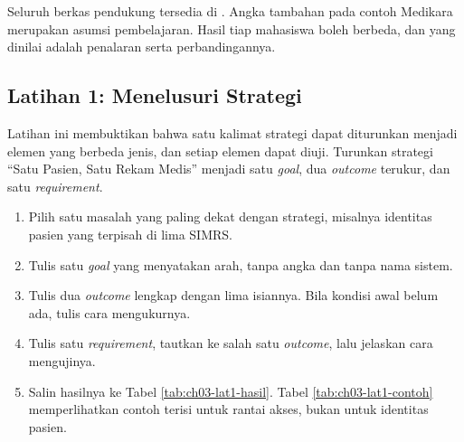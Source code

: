 Seluruh berkas pendukung tersedia di . Angka tambahan pada contoh
Medikara merupakan asumsi pembelajaran. Hasil tiap mahasiswa boleh berbeda, dan yang dinilai
adalah penalaran serta perbandingannya.

\subsection*{Latihan 1: Menelusuri Strategi}

Latihan ini membuktikan bahwa satu kalimat strategi dapat diturunkan menjadi elemen yang
berbeda jenis, dan setiap elemen dapat diuji. Turunkan strategi ``Satu Pasien, Satu Rekam
Medis'' menjadi satu \textit{goal}, dua \textit{outcome} terukur, dan satu
\textit{requirement}.

\begin{enumerate}
  \item Pilih satu masalah yang paling dekat dengan strategi, misalnya identitas pasien yang
        terpisah di lima SIMRS.
  \item Tulis satu \textit{goal} yang menyatakan arah, tanpa angka dan tanpa nama sistem.
  \item Tulis dua \textit{outcome} lengkap dengan lima isiannya. Bila kondisi awal belum
        ada, tulis cara mengukurnya.
  \item Tulis satu \textit{requirement}, tautkan ke salah satu \textit{outcome}, lalu
        jelaskan cara mengujinya.
  \item Salin hasilnya ke Tabel \ref{tab:ch03-lat1-hasil}. Tabel \ref{tab:ch03-lat1-contoh}
        memperlihatkan contoh terisi untuk rantai akses, bukan untuk identitas pasien.
\end{enumerate}

